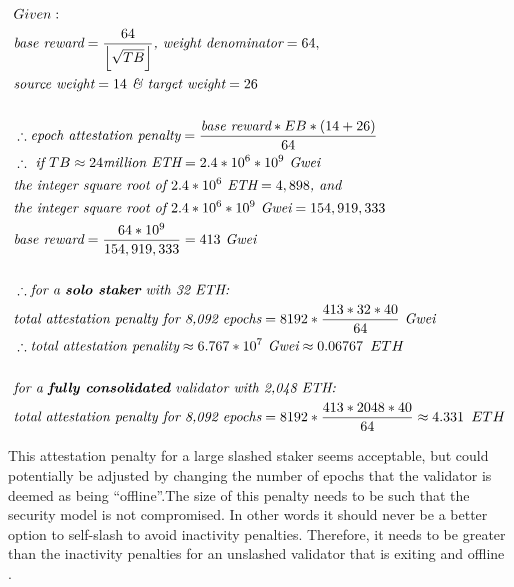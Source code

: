 \documentclass{article}
\begin{document}
\begin{equation*}
\begin{split}
& Given:\\
& \textit{base reward} = \frac{64}{ \left\lfloor \sqrt{TB} \right\rfloor} \textit{, weight denominator} = 64, \\
& \textit{source weight} = 14 \textit{  \& target weight} = 26\\
& \\
& \therefore \textit{epoch attestation penalty} = \frac{\textit{base reward} * EB * (14 + 26)}{64} \\
& \therefore \textit{ if } TB \approx 24 \textit{million ETH} = 2.4 * 10^6 * 10^9 \textit{ Gwei}\\
& \textit{the integer square root of } 2.4 * 10^6 \textit{ ETH} = 4,898 \textit{, and} \\
& \textit{the integer square root of } 2.4 * 10^6 * 10^9 \textit{ Gwei} = 154,919,333 \\
& \textit{base reward} = \frac{64 * 10^9}{154,919,333} = 413 \textit{ Gwei} \\
& \\
& \therefore \textit{for a \textbf{solo staker} with 32 ETH:} \\
& \textit{total attestation penalty for 8,092 epochs} = 8192 * \frac{413*32*40}{64}  \textit{ Gwei}\\
& \therefore \textit{total attestation penality} \approx 6.767 * 10^7 \textit{ Gwei} \approx 0.06767 \texttt{ } ETH \\
& \\
& \textit{for a \textbf{fully consolidated} validator with 2,048 ETH:} \\
& \textit{total attestation penalty for 8,092 epochs} = 8192 * \frac{413*2048*40}{64}\approx 4.331 \texttt{ } ETH \\
\end{split}
\end{equation*}

This attestation penalty for a large slashed staker seems acceptable, but could
potentially be adjusted by changing the number of epochs that the validator is
deemed as being ``offline''.The size of this penalty needs to be such that the
security model is not compromised. In other words it should never be a better
option to self-slash to avoid inactivity penalties. Therefore, it needs to be
greater than the inactivity penalties for an unslashed validator that is
exiting and offline \cite{Neuder2023d}.
\end{document}
